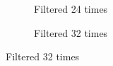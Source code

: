 \documentclass[paper=a4, fontsize=11pt]{scrartcl} %
\numberwithin{equation}{section} %
\numberwithin{figure}{section} %
\numberwithin{table}{section} %
\begin{document}
\begin{figure}[H]
	\begin{subfigure}[b]{0.45\textwidth}
		\noindent{}
	\caption{Filtered 24 times}
	\end{subfigure}
	\hspace{5mm}
	\begin{subfigure}[b]{0.45\textwidth}
		\noindent{}
	\caption{Filtered 32 times}
	\end{subfigure}
\end{figure}
\end{document}
